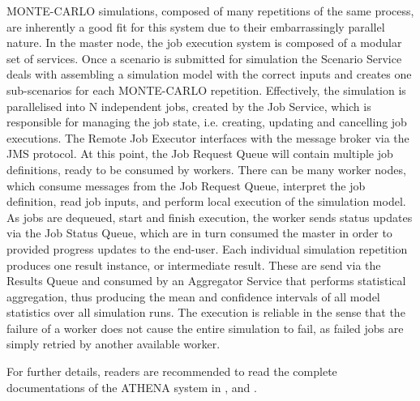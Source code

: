MONTE-CARLO simulations, composed of many repetitions of the same process, are inherently a good fit for this system due to their embarrassingly parallel nature. 
In the master node, the job execution system is composed of a modular set of services. Once a scenario is submitted for simulation the Scenario Service deals with assembling a simulation model with the correct inputs and creates one sub-scenarios for each MONTE-CARLO repetition. Effectively, the simulation is parallelised into N independent jobs, created by the Job Service, which is responsible for managing the job state, i.e. creating, updating and cancelling job executions. The Remote Job Executor interfaces with the message broker via the JMS protocol. At this point, the Job Request Queue will contain multiple job definitions, ready to be consumed by workers. 
There can be many worker nodes, which consume messages from the Job Request Queue, interpret the job definition, read job inputs, and perform local execution of the simulation model. As jobs are dequeued, start and finish execution, the worker sends status updates via the Job Status Queue, which are in turn consumed the master in order to provided progress updates to the end-user. Each individual simulation repetition produces one result instance, or intermediate result. These are send via the Results Queue and consumed by an Aggregator Service that performs statistical aggregation, thus producing the mean and confidence intervals of all model statistics over all simulation runs. The execution is reliable in the sense that the failure of a worker does not cause the entire simulation to fail, as failed jobs are simply retried by another available worker. 

For further details, readers are recommended to read the complete documentations of the ATHENA system in \parencite{athenaTechDoc} \parencite{athenaUserDoc}, \parencite{athenaAdminDoc} and \parencite{athenaDeployDoc}.
